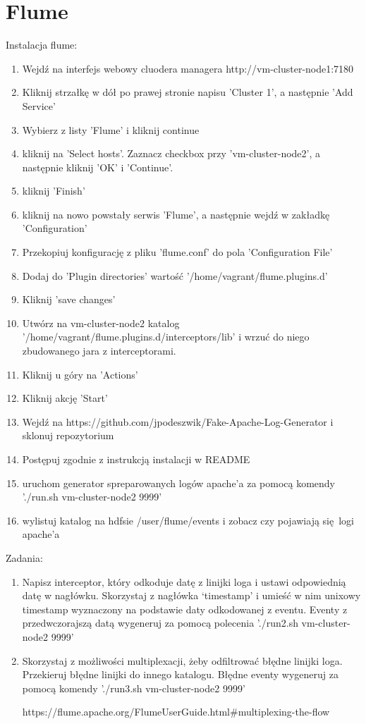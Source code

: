 \documentclass[11pt]{article}
\begin{document}
\section*{Flume}

Instalacja flume:
\begin{enumerate}
\item Wejdź na interfejs webowy cluodera managera http://vm-cluster-node1:7180
\item Kliknij strzałkę w dół po prawej stronie napisu 'Cluster 1', a następnie 'Add Service'
\item Wybierz z listy 'Flume' i kliknij continue
\item kliknij na 'Select hosts'. Zaznacz checkbox przy 'vm-cluster-node2', a następnie kliknij 'OK' i 'Continue'.
\item kliknij 'Finish'
\item kliknij na nowo powstały serwis 'Flume', a następnie wejdź w zakładkę 'Configuration'
\item Przekopiuj konfigurację z pliku 'flume.conf' do pola 'Configuration File'
\item Dodaj do 'Plugin directories' wartość '/home/vagrant/flume.plugins.d'
\item Kliknij 'save changes'
\item Utwórz na vm-cluster-node2 katalog '/home/vagrant/flume.plugins.d/interceptors/lib' i wrzuć do niego zbudowanego jara z interceptorami.
\item Kliknij u góry na 'Actions'
\item Kliknij akcję 'Start'
\item Wejdź na https://github.com/jpodeszwik/Fake-Apache-Log-Generator i sklonuj repozytorium
\item Postępuj zgodnie z instrukcją instalacji w README
\item uruchom generator spreparowanych logów apache'a za pomocą komendy './run.sh vm-cluster-node2 9999'
\item wylistuj katalog na hdfsie /user/flume/events i zobacz czy pojawiają się logi apache'a
\end{enumerate}

\pagebreak

Zadania:
\begin{enumerate}
\item Napisz interceptor, który odkoduje datę z linijki loga i ustawi odpowiednią datę w nagłówku. Skorzystaj z nagłówka ‘timestamp’ i umieść w nim unixowy timestamp wyznaczony na podstawie daty odkodowanej z eventu. Eventy z przedwczorajszą datą wygeneruj za pomocą polecenia './run2.sh vm-cluster-node2 9999'
\item Skorzystaj z możliwości multiplexacji, żeby odfiltrować błędne linijki loga. Przekieruj błędne linijki do innego katalogu. Błędne eventy wygeneruj za pomocą komendy './run3.sh vm-cluster-node2 9999'

https://flume.apache.org/FlumeUserGuide.html\#multiplexing-the-flow
\end{enumerate}
\end{document}
